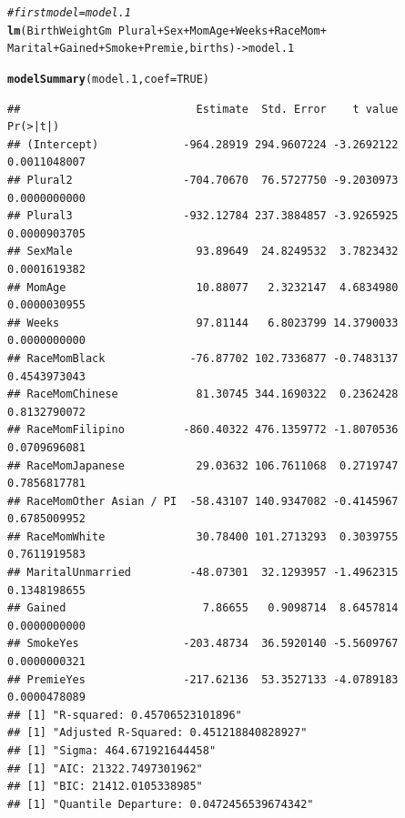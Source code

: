 \documentclass{article}\usepackage[]{graphicx}\usepackage[]{xcolor}
\makeatletter
\newcommand{\hlnum}[1]{\textcolor[rgb]{0.686,0.059,0.569}{#1}}%
\newcommand{\hlcom}[1]{\textcolor[rgb]{0.678,0.584,0.686}{\textit{#1}}}%
\newcommand{\hlopt}[1]{\textcolor[rgb]{0,0,0}{#1}}%
\newcommand{\hlstd}[1]{\textcolor[rgb]{0.345,0.345,0.345}{#1}}%
\newcommand{\hlkwb}[1]{\textcolor[rgb]{0.69,0.353,0.396}{#1}}%
\newcommand{\hlkwc}[1]{\textcolor[rgb]{0.333,0.667,0.333}{#1}}%
\newcommand{\hlkwd}[1]{\textcolor[rgb]{0.737,0.353,0.396}{\textbf{#1}}}%
\newenvironment{kframe}{%
 \def\at@end@of@kframe{}%
 \ifinner\ifhmode%
  \def\at@end@of@kframe{\end{minipage}}%
  \begin{minipage}{\columnwidth}%
 \fi\fi%
 \def\FrameCommand##1{\hskip\@totalleftmargin \hskip-\fboxsep
 \colorbox{shadecolor}{##1}\hskip-\fboxsep
     \hskip-\linewidth \hskip-\@totalleftmargin \hskip\columnwidth}%
 \MakeFramed {\advance\hsize-\width
   \@totalleftmargin\z@ \linewidth\hsize
   \@setminipage}}%
 {\par\unskip\endMakeFramed%
 \at@end@of@kframe}
\newenvironment{knitrout}{}{} %
\makeatother
\begin{document}
  
\begin{knitrout}
\color{fgcolor}\begin{kframe}
\begin{alltt}
\hlcom{#first model = model.1}
\hlkwd{lm}\hlstd{(BirthWeightGm} \hlopt{~} \hlstd{Plural} \hlopt{+} \hlstd{Sex} \hlopt{+} \hlstd{MomAge} \hlopt{+} \hlstd{Weeks} \hlopt{+} \hlstd{RaceMom} \hlopt{+}
     \hlstd{Marital} \hlopt{+} \hlstd{Gained} \hlopt{+} \hlstd{Smoke} \hlopt{+} \hlstd{Premie, births)} \hlkwb{->} \hlstd{model.1}

\hlkwd{modelSummary}\hlstd{(model.1,} \hlkwc{coef} \hlstd{=} \hlnum{TRUE}\hlstd{)}
\end{alltt}
\begin{verbatim}
##                           Estimate  Std. Error    t value     Pr(>|t|)
## (Intercept)             -964.28919 294.9607224 -3.2692122 0.0011048007
## Plural2                 -704.70670  76.5727750 -9.2030973 0.0000000000
## Plural3                 -932.12784 237.3884857 -3.9265925 0.0000903705
## SexMale                   93.89649  24.8249532  3.7823432 0.0001619382
## MomAge                    10.88077   2.3232147  4.6834980 0.0000030955
## Weeks                     97.81144   6.8023799 14.3790033 0.0000000000
## RaceMomBlack             -76.87702 102.7336877 -0.7483137 0.4543973043
## RaceMomChinese            81.30745 344.1690322  0.2362428 0.8132790072
## RaceMomFilipino         -860.40322 476.1359772 -1.8070536 0.0709696081
## RaceMomJapanese           29.03632 106.7611068  0.2719747 0.7856817781
## RaceMomOther Asian / PI  -58.43107 140.9347082 -0.4145967 0.6785009952
## RaceMomWhite              30.78400 101.2713293  0.3039755 0.7611919583
## MaritalUnmarried         -48.07301  32.1293957 -1.4962315 0.1348198655
## Gained                     7.86655   0.9098714  8.6457814 0.0000000000
## SmokeYes                -203.48734  36.5920140 -5.5609767 0.0000000321
## PremieYes               -217.62136  53.3527133 -4.0789183 0.0000478089
## [1] "R-squared: 0.45706523101896"
## [1] "Adjusted R-Squared: 0.451218840828927"
## [1] "Sigma: 464.671921644458"
## [1] "AIC: 21322.7497301962"
## [1] "BIC: 21412.0105338985"
## [1] "Quantile Departure: 0.0472456539674342"
\end{verbatim}
\end{kframe}

\end{knitrout}
\end{document}
